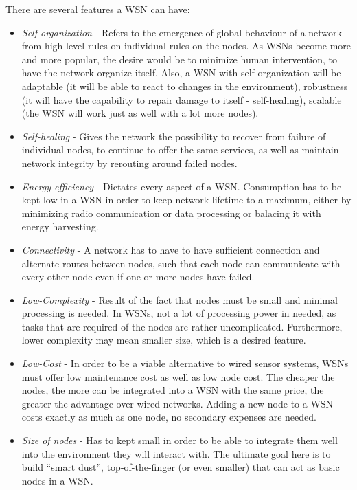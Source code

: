 There are several features a WSN can have: 
\begin{itemize}
\item \textit{Self-organization} - Refers to the emergence of global behaviour of a network from high-level rules on individual rules
on the nodes. As WSNs become more and more popular, the desire would be to minimize human intervention, to have the network 
organize itself. Also, a WSN with self-organization will be adaptable (it will be able to react to changes in the environment),
robustness (it will have the capability to repair damage to itself - self-healing), scalable (the WSN will work just as well
with a lot more nodes). \cite{Bett2005}
\item \textit{Self-healing} - Gives the network the possibility to recover from failure of individual nodes, to continue to 
offer the same services, as well as maintain network integrity by rerouting around failed nodes.
\item \textit{Energy efficiency} - Dictates every aspect of a WSN. Consumption has to be kept low in a WSN in order to
keep network lifetime to a maximum, either by minimizing radio communication or data processing or balacing it with 
energy harvesting.
\item \textit{Connectivity} - A network has to have to have sufficient connection and alternate routes between nodes, such that each node can
communicate with every other node even if one or more nodes have failed.
\item \textit{Low-Complexity} - Result of the fact that nodes must be small and minimal processing is needed. In WSNs, not a lot of processing power
in needed, as tasks that are required of the nodes are rather uncomplicated. Furthermore, lower complexity may mean smaller size, which is 
a desired feature.
\item \textit{Low-Cost} - In order to be a viable alternative to wired sensor systems, WSNs must offer low maintenance cost as well as low node cost.
The cheaper the nodes, the more can be integrated into a WSN with the same price, the greater the advantage over wired networks. Adding a new node 
to a WSN costs exactly as much as one node, no secondary expenses are needed.
\item \textit{Size of nodes} - Has to kept small in order to be able to integrate them well into the environment they will
interact with. The ultimate goal here is to build ``smart dust'', top-of-the-finger (or even smaller) that can act as basic nodes
in a WSN.
\end{itemize}





